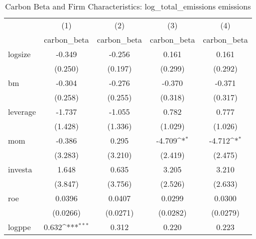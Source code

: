 \begin{table}[htbp]\centering
\def\sym#1{\ifmmode^{#1}\else\(^{#1}\)\fi}
\caption{Carbon Beta and Firm Characteristics: log\_total\_emissions emissions}
\begin{tabular}{l*{4}{c}}
\hline\hline
                    &\multicolumn{1}{c}{(1)}&\multicolumn{1}{c}{(2)}&\multicolumn{1}{c}{(3)}&\multicolumn{1}{c}{(4)}\\
                    &\multicolumn{1}{c}{carbon\_beta}&\multicolumn{1}{c}{carbon\_beta}&\multicolumn{1}{c}{carbon\_beta}&\multicolumn{1}{c}{carbon\_beta}\\
\hline
logsize             &      -0.349         &      -0.256         &       0.161         &       0.161         \\
                    &     (0.250)         &     (0.197)         &     (0.299)         &     (0.292)         \\
[1em]
bm                  &      -0.304         &      -0.276         &      -0.370         &      -0.371         \\
                    &     (0.258)         &     (0.255)         &     (0.318)         &     (0.317)         \\
[1em]
leverage            &      -1.737         &      -1.055         &       0.782         &       0.777         \\
                    &     (1.428)         &     (1.336)         &     (1.029)         &     (1.026)         \\
[1em]
mom                 &      -0.386         &       0.295         &      -4.709\sym{*}  &      -4.712\sym{*}  \\
                    &     (3.283)         &     (3.210)         &     (2.419)         &     (2.475)         \\
[1em]
investa             &       1.648         &       0.635         &       3.205         &       3.210         \\
                    &     (3.847)         &     (3.756)         &     (2.526)         &     (2.633)         \\
[1em]
roe                 &      0.0396         &      0.0407         &      0.0299         &      0.0300         \\
                    &    (0.0266)         &    (0.0271)         &    (0.0282)         &    (0.0279)         \\
[1em]
logppe              &       0.632\sym{***}&       0.312         &       0.220         &       0.223         \\

\end{tabular}
\end{table}

